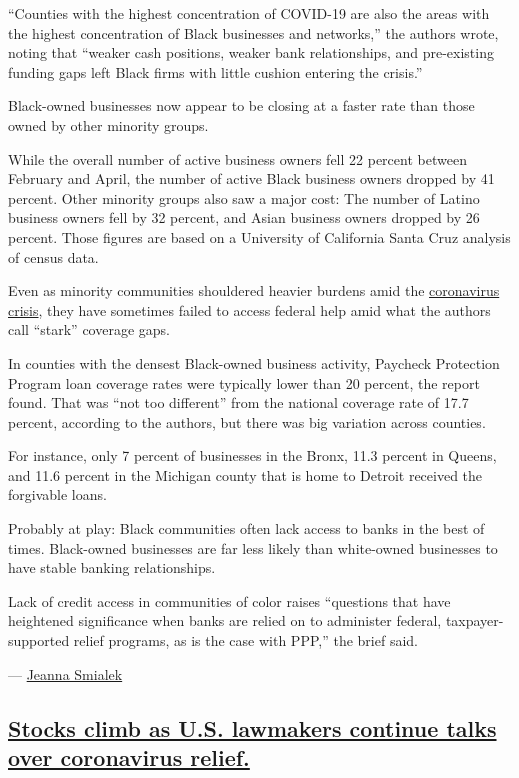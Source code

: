 ``Counties with the highest concentration of COVID-19 are also the areas
with the highest concentration of Black businesses and networks,'' the
authors wrote, noting that ``weaker cash positions, weaker bank
relationships, and pre-existing funding gaps left Black firms with
little cushion entering the crisis.''

Black-owned businesses now appear to be closing at a faster rate than
those owned by other minority groups.

While the overall number of active business owners fell 22 percent
between February and April, the number of active Black business owners
dropped by 41 percent. Other minority groups also saw a major cost: The
number of Latino business owners fell by 32 percent, and Asian business
owners dropped by 26 percent. Those figures are based on a University of
California Santa Cruz analysis of census data.

Even as minority communities shouldered heavier burdens amid the
\href{https://www.nytimes.com/2020/04/07/us/coronavirus-race.html}{coronavirus
crisis}, they have sometimes failed to access federal help amid what the
authors call ``stark'' coverage gaps.

In counties with the densest Black-owned business activity, Paycheck
Protection Program loan coverage rates were typically lower than 20
percent, the report found. That was ``not too different'' from the
national coverage rate of 17.7 percent, according to the authors, but
there was big variation across counties.

For instance, only 7 percent of businesses in the Bronx, 11.3 percent in
Queens, and 11.6 percent in the Michigan county that is home to Detroit
received the forgivable loans.

Probably at play: Black communities often lack access to banks in the
best of times. Black-owned businesses are far less likely than
white-owned businesses to have stable banking relationships.

Lack of credit access in communities of color raises ``questions that
have heightened significance when banks are relied on to administer
federal, taxpayer-supported relief programs, as is the case with PPP,''
the brief said.

--- \href{https://www.nytimes.com/by/jeanna-smialek}{Jeanna Smialek}

\hypertarget{stocks-climb-as-us-lawmakers-continue-talks-over-coronavirus-relief}{%
\subsection{\texorpdfstring{\protect\hyperlink{stocks-climb-as-us-lawmakers-continue-talks-over-coronavirus-relief}{Stocks
climb as U.S. lawmakers continue talks over coronavirus
relief.}}{Stocks climb as U.S. lawmakers continue talks over coronavirus relief.}}\label{stocks-climb-as-us-lawmakers-continue-talks-over-coronavirus-relief}}


